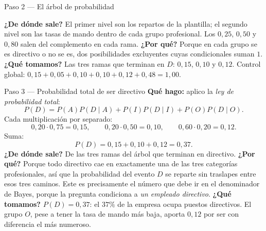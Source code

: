 \documentclass[11pt]{article}
\begin{document}
\begin{sol}
\begin{paso}{Paso 2 --- El árbol de probabilidad}
\begin{center}
\shorthandon{<>}
\end{center}

\textbf{¿De dónde sale?} El primer nivel son los repartos de la plantilla; el segundo nivel son las tasas de mando dentro de cada grupo profesional. Los $0,25$, $0,50$ y $0,80$ salen del complemento en cada rama.
\textbf{¿Por qué?} Porque en cada grupo se es directivo o no se es, dos posibilidades excluyentes cuyas condicionales suman $1$.
\textbf{¿Qué tomamos?} Las tres ramas que terminan en $D$: $0,15$, $0,10$ y $0,12$. Control global: $0,15+0,05+0,10+0,10+0,12+0,48=1,00$.
\end{paso}

\begin{paso}{Paso 3 --- Probabilidad total de ser directivo}
\textbf{Qué hago:} aplico la \emph{ley de probabilidad total}:
\[
P(D)=P(A)P(D\mid A)+P(I)P(D\mid I)+P(O)P(D\mid O).
\]
Cada multiplicación por separado:
\[
0,20\cdot 0,75=0,15,\qquad 0,20\cdot 0,50=0,10,\qquad 0,60\cdot 0,20=0,12 .
\]
Suma:
\[
P(D)=0,15+0,10+0,12=0,37 .
\]
\textbf{¿De dónde sale?} De las tres ramas del árbol que terminan en directivo.
\textbf{¿Por qué?} Porque todo directivo cae en exactamente una de las tres categorías profesionales, así que la probabilidad del evento $D$ se reparte sin traslapes entre esos tres caminos. Este es precisamente el número que debe ir en el denominador de Bayes, porque la pregunta condiciona a \emph{un empleado directivo}.
\textbf{¿Qué tomamos?} $P(D)=0,37$: el $37\%$ de la empresa ocupa puestos directivos. El grupo $O$, pese a tener la tasa de mando más baja, aporta $0,12$ por ser con diferencia el más numeroso.
\end{paso}


\end{sol}
\end{document}
